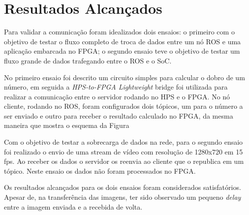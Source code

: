 \chapter{Resultados Alcançados}

Para validar a comunicação foram idealizados dois ensaios: o primeiro com o objetivo de testar o fluxo completo de troca de dados entre um nó ROS e uma aplicação embarcada no FPGA; o segundo ensaio teve o objetivo de testar um fluxo grande de dados trafegando entre o ROS e o SoC.

No primeiro ensaio foi descrito um circuito simples para calcular o dobro de um número, em seguida a \textit{HPS-to-FPGA Lightweight} bridge foi utilizada para realizar a comunicação entre o servidor rodando no HPS e o FPGA\@. No nó cliente, rodando no ROS, foram configurados dois tópicos, um para o número a ser enviado e outro para receber o resultado calculado no FPGA, da mesma maneira que mostra o esquema da Figura 

Com o objetivo de testar a sobrecarga de dados na rede, para o segundo ensaio foi realizado o envio de uma stream de vídeo com resolução de 1280x720 em 15 fps. Ao receber os dados o servidor os reenvia ao cliente que o republica em um tópico. Neste ensaio os dados não foram processados no FPGA\@. 

Os resultados alcançados para os dois ensaios foram considerados satisfatórios. Apesar de, na transferência das imagens, ter sido observado um pequeno \textit{delay} entre a imagem enviada e a recebida de volta.